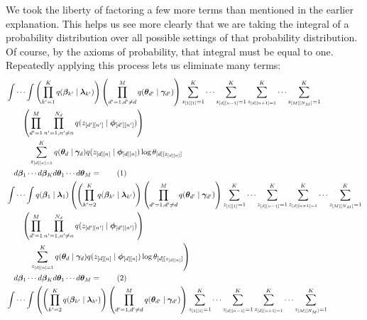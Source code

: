 \documentclass[12pt]{article}
\newcommand\numberthis{\addtocounter{equation}{1}\tag{\theequation}}
\begin{document}
We took the liberty of factoring a few more terms than mentioned in the earlier
explanation.  This helps us see more clearly that we are taking the integral of
a probability distribution over all possible settings of that probability
distribution.  Of course, by the axioms of probability, that integral must be
equal to one.  Repeatedly applying this process lets us eliminate many terms:
\begin{align*}
    &\int \cdots \int \left(\prod_{k'=1}^{K} q(\bm{\beta}_{k'} \mid
    \bm{\lambda}_{k'})\right)
    \left(\prod_{d'=1, d'\neq d}^{M}q(\bm{\theta}_{d'} \mid \bm{\gamma}_{d'})\right)
    \sum_{z_{[1][1]}=1}^{K} \cdots \sum_{z_{[d][n-1]}=1}^{K}
    \sum_{z_{[d][n+1]=1}}^{K} \cdots \sum_{z_{[M][N_{M}]}=1}^{K} \\*
    &\quad\quad \left(\prod_{d'=1}^{M}\prod_{n'=1, n'\neq n}^{N_{d}}
    q(z_{[d'][n']} \mid
    \bm{\phi}_{[d'][n']})\right) \\*
    &\quad\quad\quad\sum_{z_{[d][n]=1}}^{K} q(\bm{\theta}_{d} \mid \bm{\gamma}_{d}) q(z_{[d][n]}
    \mid \bm{\phi}_{[d][n]})\log \theta_{[d][z_{[d][n]}]}\\*
    &\quad d\bm{\beta}_{1}\cdots d\bm{\beta}_{K}d\bm{\theta}_{1}\cdots
    d\bm{\theta}_{M} = \numberthis \\
    &\int \cdots \int q(\bm{\beta}_{1} \mid \bm{\lambda}_{1})
    \left(\left(\prod_{k'=2}^{K} q(\bm{\beta}_{k'} \mid \bm{\lambda}_{k'})\right)
    \left(\prod_{d'=1, d'\neq d}^{M}q(\bm{\theta}_{d'} \mid \bm{\gamma}_{d'})\right)
    \sum_{z_{[1][1]}=1}^{K} \cdots \sum_{z_{[d][n-1]}=1}^{K}
    \sum_{z_{[d][n+1]=1}}^{K} \cdots \sum_{z_{[M][N_{M}]}=1}^{K} \right.\\*
    &\quad\quad \left(\prod_{d'=1}^{M}\prod_{n'=1, n'\neq n}^{N_{d}}
    q(z_{[d'][n']} \mid
    \bm{\phi}_{[d'][n']})\right) \\*
    &\left.\quad\quad\quad\sum_{z_{[d][n]=1}}^{K}
    q(\bm{\theta}_{d} \mid \bm{\gamma}_{d}) q(z_{[d][n]}
    \mid \bm{\phi}_{[d][n]})\log \theta_{[d][z_{[d][n]}]}\right)\\*
    &\quad d\bm{\beta}_{1}\cdots d\bm{\beta}_{K}d\bm{\theta}_{1}\cdots
    d\bm{\theta}_{M} = \numberthis \\
    &\int \cdots \int
    \left(\left(\prod_{k'=2}^{K} q(\bm{\beta}_{k'} \mid \bm{\lambda}_{k'})\right)
    \left(\prod_{d'=1, d'\neq d}^{M}q(\bm{\theta}_{d'} \mid \bm{\gamma}_{d'})\right)
    \sum_{z_{[1][1]}=1}^{K} \cdots \sum_{z_{[d][n-1]}=1}^{K}
    \sum_{z_{[d][n+1]=1}}^{K} \cdots \sum_{z_{[M][N_{M}]}=1}^{K} \right.\\*

\end{align*}
\end{document}
